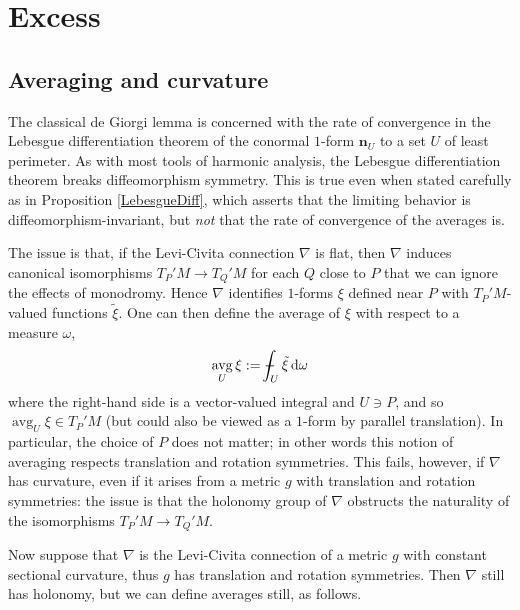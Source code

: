 \documentclass[reqno,10pt]{amsart}
\DeclareMathOperator{\avg}{avg}
\newcommand*\dif{\mathop{}\!\mathrm{d}}
\newcommand{\normal}{\mathbf n}
\theoremstyle{definition}
\numberwithin{equation}{section}
\def\Xint#1{\mathchoice
{\XXint\displaystyle\textstyle{#1}}%
{\XXint\textstyle\scriptstyle{#1}}%
{\XXint\scriptstyle\scriptscriptstyle{#1}}%
{\XXint\scriptscriptstyle\scriptscriptstyle{#1}}%
\!\int}
\def\XXint#1#2#3{{\setbox0=\hbox{$#1{#2#3}{\int}$ }
\vcenter{\hbox{$#2#3$ }}\kern-.6\wd0}}
\def\dashint{\Xint-}
\begin{document}
\section{Excess}\label{excess section}
\subsection{Averaging and curvature}
The classical de Giorgi lemma is concerned with the rate of convergence in the Lebesgue differentiation theorem of the conormal $1$-form $\normal_U$ to a set $U$ of least perimeter.
As with most tools of harmonic analysis, the Lebesgue differentiation theorem breaks diffeomorphism symmetry.
This is true even when stated carefully as in Proposition \ref{LebesgueDiff}, which asserts that the limiting behavior is diffeomorphism-invariant, but \emph{not} that the rate of convergence of the averages is.

The issue is that, if the Levi-Civita connection $\nabla$ is flat, then $\nabla$ induces canonical isomorphisms $T_P'M \to T_Q'M$ for each $Q$ close to $P$ that we can ignore the effects of monodromy.
Hence $\nabla$ identifies $1$-forms $\xi$ defined near $P$ with $T_P'M$-valued functions $\tilde \xi$.
One can then define the average of $\xi$ with respect to a measure $\omega$,
\begin{equation}\label{averages and flat connections}
\avg_U \xi := \dashint_U \tilde \xi \dif \omega
\end{equation}
where the right-hand side is a vector-valued integral and $U \ni P$, and so $\avg_U \xi \in T_P'M$ (but could also be viewed as a $1$-form by parallel translation).
In particular, the choice of $P$ does not matter; in other words this notion of averaging respects translation and rotation symmetries.
This fails, however, if $\nabla$ has curvature, even if it arises from a metric $g$ with translation and rotation symmetries: the issue is that the holonomy group of $\nabla$ obstructs the naturality of the isomorphisms $T_P'M \to T_Q'M$.

Now suppose that $\nabla$ is the Levi-Civita connection of a metric $g$ with constant sectional curvature, thus $g$ has translation and rotation symmetries.
Then $\nabla$ still has holonomy, but we can define averages still, as follows.
\end{document}
